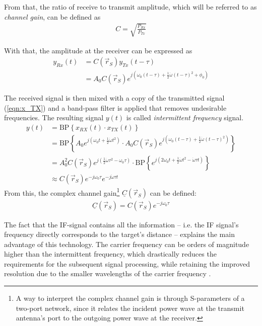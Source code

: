 From that, the ratio of receive to transmit amplitude,
which will be referred to as \emph{channel gain}, can be defined as
\begin{align}
    C = \sqrt{\frac{P_{Rx}}{P_{Tx}}}
\end{align}

With that, the amplitude at the receiver can be expressed as
\begin{align}
    y_{Rx}(t) & = C(\vec r_S) y_{Tx}(t-\tau)                                                                     \\
              & = A_0C(\vec r_S) e^{j\left(\omega_0(t-\tau) + \frac{1}{2}\dot \omega (t-\tau)^2 + \phi_0\right)}
\end{align}

The received signal is then mixed with a copy of the transmitted signal (\ref{eqn:x_TX})
and a band-pass filter is applied that removes undesirable frequencies.
The resulting signal $y(t)$ is called \textit{intermittent frequency} signal.
\begin{align}
    y(t) & = \text{BP} \left\{ x_{RX}(t) \cdot x_{TX}(t) \right\}                        \\
         & = \text{BP} \left\{
    A_0 e^{j(\omega_0t + \frac{1}{2}\dot \omega t^2) }
    \cdot A_0C(\vec r_S) e^{j(\omega_0(t-\tau) + \frac{1}{2}\dot \omega (t-\tau)^2) }
    \right\}                                                                             \\
         & = A_0^2C(\vec r_S)
    e^{j(\frac{1}{2}\dot\omega\tau^2- \omega_0\tau)}
    \cdot  \text{BP} \left\{
    e^{j(2\omega_0 t + \frac{1}{2}\dot\omega t^2 - \dot\omega\tau t)}
    \right\}                                                                             \\
         & \approx C(\vec r_S)e^{-j\omega_0\tau} e^{-j\dot\omega\tau t} \label{eq:y_IF}
\end{align}
From this, the complex channel gain\footnote{
    A way to interpret the complex channel gain is through S-parameters of a two-port network,
    since it relates the incident power wave at the transmit antenna's port to the outgoing power wave at the receiver.
} $\underline C(\vec r_S)$ can be defined:
\begin{align}
    \underline C(\vec r_S) = C(\vec r_S)e^{-j\omega_0\tau} \label{eq:G}
\end{align}

The fact that the IF-signal contains all the information
-- i.e. the IF signal's frequency directly corresponds to the target's distance --
explains the main advantage of this technology.
The carrier frequency can be orders of magnitude higher than the intermittent frequency,
which drastically reduces the requirements for the subsequent signal processing,
while retaining the improved resolution due to the smaller wavelengths of the carrier frequency \cite{jankiraman}.

